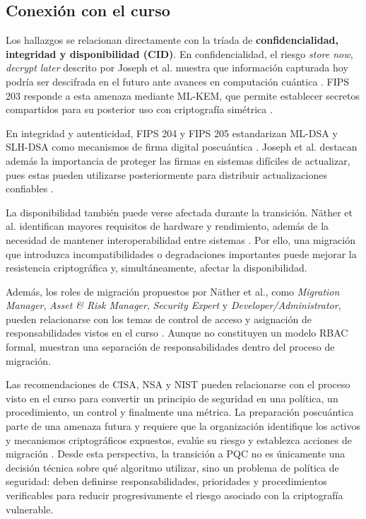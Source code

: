 \subsection{Conexión con el curso}

Los hallazgos se relacionan directamente con la tríada de
\textbf{confidencialidad, integridad y disponibilidad (CID)}. En
confidencialidad, el riesgo \textit{store now, decrypt later} descrito por
Joseph et al. muestra que información capturada hoy podría ser descifrada
en el futuro ante avances en computación cuántica
\cite{joseph2022transitioning}. FIPS 203 responde a esta amenaza mediante
ML-KEM, que permite establecer secretos compartidos para su posterior uso
con criptografía simétrica \cite{nist2024fips203}.

En integridad y autenticidad, FIPS 204 y FIPS 205 estandarizan ML-DSA y
SLH-DSA como mecanismos de firma digital poscuántica
\cite{nist2024fips204,nist2024fips205}. Joseph et al. destacan además la
importancia de proteger las firmas en sistemas difíciles de actualizar,
pues estas pueden utilizarse posteriormente para distribuir actualizaciones
confiables \cite{joseph2022transitioning}.

La disponibilidad también puede verse afectada durante la transición.
Näther et al. identifican mayores requisitos de hardware y rendimiento,
además de la necesidad de mantener interoperabilidad entre sistemas
\cite{naether2024migrating}. Por ello, una migración que introduzca
incompatibilidades o degradaciones importantes puede mejorar la resistencia
criptográfica y, simultáneamente, afectar la disponibilidad.

Además, los roles de migración propuestos por Näther et al., como
\textit{Migration Manager}, \textit{Asset \& Risk Manager},
\textit{Security Expert} y \textit{Developer/Administrator}, pueden
relacionarse con los temas de control de acceso y asignación de
responsabilidades vistos en el curso \cite{naether2024migrating}. Aunque
no constituyen un modelo RBAC formal, muestran una separación de
responsabilidades dentro del proceso de migración.

Las recomendaciones de CISA, NSA y NIST pueden relacionarse con el proceso visto en el curso para convertir un principio de seguridad en una política, un procedimiento, un control y finalmente una métrica. La preparación poscuántica parte de una amenaza futura y requiere que la organización identifique los activos y mecanismos criptográficos expuestos, evalúe su
riesgo y establezca acciones de migración \cite{cisa2023quantum}. Desde esta perspectiva, la transición a PQC no es únicamente una decisión técnica sobre qué algoritmo utilizar, sino un problema de política de seguridad: deben definirse responsabilidades, prioridades y procedimientos verificables para reducir progresivamente el riesgo asociado con la criptografía vulnerable.

